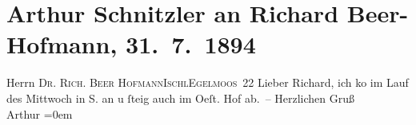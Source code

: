 

         
         \renewcommand{\erwaehntePersonen}{Personen: Richard Beer-Hofmann}
         \renewcommand{\erwaehnteOrte}{Orte: Bad Ischl, Eglmoosgasse, IX., Alsergrund, Salzburg, Wien, Österreichischer Hof}
         \renewcommand{\erwaehnteWerke}{}
               \section[Arthur Schnitzler an Richard Beer-Hofmann, 31. 7. 1894]{ Arthur Schnitzler an Richard Beer-Hofmann, 31. 7. 1894}\nopagebreak{}\rehead{ }\begin{ledgroupsized}[t]{13cm}\normalsize\beginnumbering \toendnotes[C]{\smallbreak\pagebreak[2]} 
\pstart{}{\pb}Herrn \textsc{Dr. Rich. Beer
                     Hofmann}\pend{}\pstart{}\textsc{Ischl}\pend{}\pstart{}\textsc{Egelmoos 22}\pend{}{\bigskip}\pstart
           \noindent{}{\pb}Lieber Richard, ich ko{\geminationm} im Lauf des Mittwoch in S. an u ſteig auch im Oeſt.
                  Hof ab. –\pend
           \pstart
           Herzlichen Gruß{\\[\baselineskip]}\spacefill\mbox{Arthur}\pend
           \leftskip=0em{}
         
         \endnumbering{}\end{ledgroupsized}  \newcommand{\dateiname}{L00361}\newcommand{\titel}{Arthur Schnitzler an Richard Beer-Hofmann, 31. 7. 1894}\newcommand{\editorInnen}{Martin Anton Müller und Gerd-Hermann Susen}
      